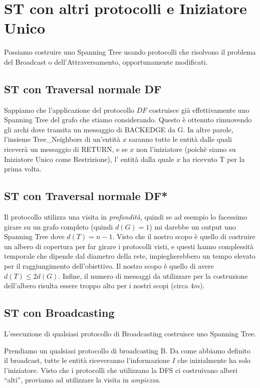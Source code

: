 \section{ST con altri protocolli e Iniziatore Unico}
Possiamo costruire uno Spanning Tree usando protocolli che risolvono il problema
del Broadcast o dell'Attraversamento, opportunamente modificati.

\subsection{ST con Traversal normale DF}
Sappiamo che l'applicazione del protocollo $DF$ costruisce già effettivamente
uno Spanning Tree del grafo che stiamo considerando. Questo è ottenuto
rimuovendo gli archi dove transita un messaggio di BACKEDGE da G. In altre
parole, l'insieme Tree\_Neighbors di un'entità $x$ saranno tutte le entità dalle
quali riceverà un messaggio di RETURN, e se $x$ non l'iniziatore (poichè siamo
su Iniziatore Unico come Restrizione), l' entità dalla quale $x$ ha ricevuto T
per la prima volta.

\subsection{ST con Traversal normale DF*}
Il protocollo utilizza una visita in \textit{profondità}, quindi se ad esempio
lo facessimo girare su un grafo completo (quindi $d(G)=1$) mi darebbe un output
uno Spanning Tree dove $d(T) = n-1$. Visto che il nostro scopo è quello di
costruire un albero di copertura per far girare i protocolli visti, e questi
hanno complessità temporale che dipende dal diametro della rete, impiegherebbero
un tempo elevato per il raggiungimento dell'obiettivo. Il nostro scopo è quello
di avere $d(T) \leq 2d(G)$. Infine, il numero di messaggi da utilizzare per la
costruzione dell'albero risulta essere troppo alto per i nostri scopi (circa
$4m$).

\subsection{ST con Broadcasting}

\begin{theorem}
    L'esecuzione di qualsiasi protocollo di Broadcasting costruisce uno Spanning
    Tree.
\end{theorem}

Prendiamo un qualsiasi protocollo di broadcasting B. Da come abbiamo definito il
broadcast, tutte le entità riceveranno l'informazione $I$ che inizialmente ha
solo l'iniziatore.
Visto che i protocolli che utilizzano la DFS ci costruivano alberi ``alti'',
proviamo ad utilizzare la visita in \textit{ampiezza}.

